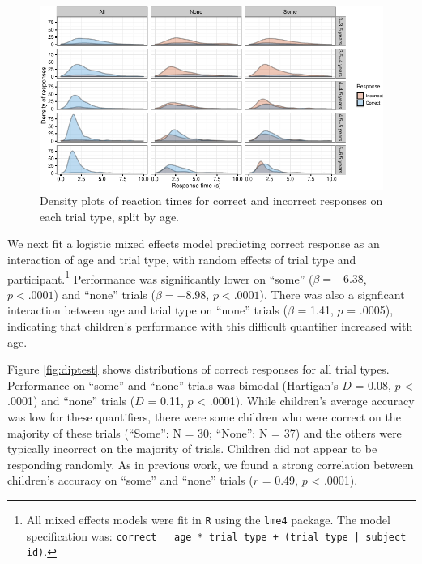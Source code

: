 \documentclass[10pt, letterpaper]{article}
\newenvironment{CodeChunk}{}{}
\begin{document}
\begin{CodeChunk}
\begin{figure}[t]

{\centering \includegraphics{figs/dense-1} 

}

\caption[Density plots of reaction times for correct and incorrect responses on each trial type, split by age]{Density plots of reaction times for correct and incorrect responses on each trial type, split by age.}\label{fig:dense}
\end{figure}
\end{CodeChunk}

We next fit a logistic mixed effects model predicting correct response
as an interaction of age and trial type, with random effects of trial
type and
participant.\footnote{All mixed effects models were fit in \texttt{R} using the \texttt{lme4} package. The model specification was: \texttt{correct ~ age * trial type + (trial type | subject id)}.}
Performance was significantly lower on ``some'' (\(\beta = -6.38\),
\(p < .0001\)) and ``none'' trials (\(\beta = -8.98\), \(p < .0001\)).
There was also a signficant interaction between age and trial type on
``none'' trials (\(\beta\) = 1.41, \(p\) = .0005), indicating that
children's performance with this difficult quantifier increased with
age.

Figure \ref{fig:diptest} shows distributions of correct responses for
all trial types. Performance on ``some'' and ``none'' trials was bimodal
(Hartigan's \(D\) = 0.08, \(p\) \textless{} .0001) and ``none'' trials
(\(D\) = 0.11, \(p\) \textless{} .0001). While children's average
accuracy was low for these quantifiers, there were some children who
were correct on the majority of these trials (``Some'': N = 30;
``None'': N = 37) and the others were typically incorrect on the
majority of trials. Children did not appear to be responding randomly.
As in previous work, we found a strong correlation between children's
accuracy on ``some'' and ``none'' trials (\(r\) = 0.49, \(p\)
\textless{} .0001).
\end{document}
